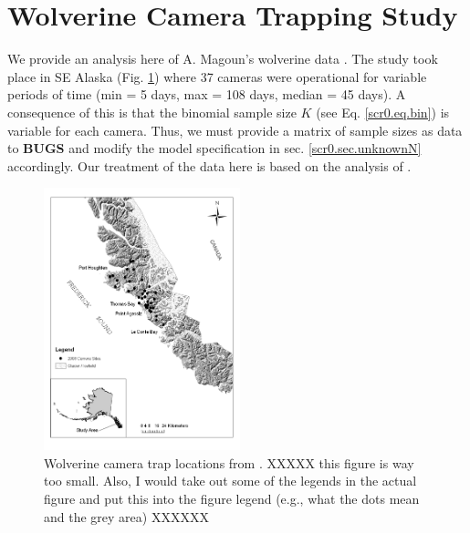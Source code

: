 \section{Wolverine Camera Trapping Study}
\label{scr0.sec.wolverine}

We provide an analysis here of A. Magoun's wolverine data
\citep{magoun_etal:2011, royle_etal:2011jwm}. The study took place in
SE Alaska (Fig. \ref{scr0.fig.wolverinelocs}) where 37 cameras were
operational for variable periods of time (min = 5 days, max = 108
days, median = 45 days).  A consequence of this is that the binomial
sample size $K$ (see Eq. \ref{scr0.eq.bin}) is variable for each
camera. Thus, we must provide a matrix of sample sizes as data to {\bf
  BUGS} and modify the model specification in
sec. \ref{scr0.sec.unknownN} accordingly. Our treatment of the data
here is based on the analysis of \citet{royle_etal:2011jwm}.

\begin{figure}
\begin{center}
\includegraphics[height=3in]{Ch4/figs/wolverinelocs}
\end{center}
\caption{Wolverine camera trap locations from \citet{magoun_etal:2011}.
XXXXX this figure is way too small. Also, I would take out some of the
legends in the actual figure and put this into the figure legend
(e.g., what the dots mean and the grey area) XXXXXX
}
\label{scr0.fig.wolverinelocs}
\end{figure}

